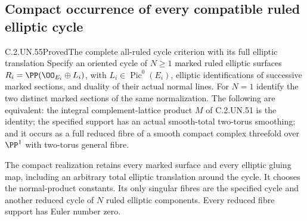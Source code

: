 \subsection{Compact occurrence of every compatible ruled elliptic cycle}

\begin{statement}{C.2.UN.55}{Proved}{The complete all-ruled cycle criterion with its full elliptic translation}
Specify an oriented cycle of $N\geq1$ marked ruled elliptic surfaces
$R_i=\PP(\OO_{E_i}\oplus L_i)$, with
$L_i\in\operatorname{Pic}^0(E_i)$, elliptic identifications of
successive marked sections, and duality of their actual normal
lines. For $N=1$ identify the two distinct marked sections of
the same normalization. The following are equivalent:
the integral complement-lattice product $M$ of C.2.UN.51 is the
identity; the specified support has an actual smooth-total
two-torus smoothing; and it occurs as a full reduced fibre of
a smooth compact complex threefold over $\PP^1$ with two-torus
general fibre.

The compact realization retains every marked surface and every
elliptic gluing map, including an arbitrary total elliptic
translation around the cycle. It chooses the normal-product
constants. Its only singular fibres are the specified cycle and
another reduced cycle of $N$ ruled elliptic components. Every
reduced fibre support has Euler number zero.
\end{statement}


